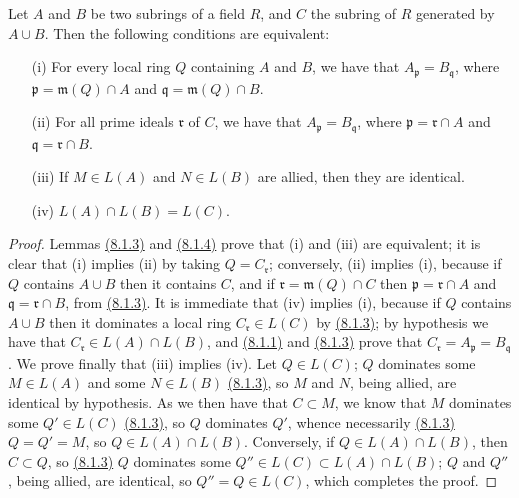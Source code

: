 \begin{prop}[8.1.5]
\label{prop-1.8.1.5}
Let $A$ and $B$ be two subrings of a field $R$,
and $C$ the subring of $R$ generated by $A\cup B$. Then the following
conditions are equivalent:
\begin{itemize}
  \item[{\rm(i)}] For every local ring $Q$ containing $A$ and $B$, we have that
        $A_\mathfrak{p}=B_\mathfrak{q}$, where $\mathfrak{p}=\mathfrak{m}(Q)\cap A$ and
        $\mathfrak{q}=\mathfrak{m}(Q)\cap B$.
  \item[{\rm(ii)}] For all prime ideals $\mathfrak{r}$ of $C$, we have that
        $A_\mathfrak{p}=B_\mathfrak{q}$, where $\mathfrak{p}=\mathfrak{r}\cap A$ and
        $\mathfrak{q}=\mathfrak{r}\cap B$.
  \item[{\rm(iii)}] If $M\in L(A)$ and $N\in L(B)$ are allied, then they are identical.
  \item[{\rm(iv)}] $L(A)\cap L(B)=L(C)$.
\end{itemize}
\end{prop}

\begin{proof}
\label{proof-prop-1.8.1.5}
Lemmas \hyperref[lem-1.8.1.3]{(8.1.3)} and \hyperref[lem-1.8.1.4]{(8.1.4)} prove that (i) and (iii) are equivalent; it
is clear that (i) implies (ii) by taking $Q=C_\mathfrak{r}$; conversely, (ii)
implies (i), because if $Q$ contains $A\cup B$ then it contains $C$, and if
$\mathfrak{r}=\mathfrak{m}(Q)\cap C$ then $\mathfrak{p}=\mathfrak{r}\cap A$ and
$\mathfrak{q}=\mathfrak{r}\cap B$, from \hyperref[lem-1.8.1.3]{(8.1.3)}. It is immediate that (iv)
implies (i), because if $Q$ contains $A\cup B$ then it dominates a local ring
$C_\mathfrak{r}\in L(C)$ by \hyperref[lem-1.8.1.3]{(8.1.3)}; by hypothesis we have that
$C_\mathfrak{r}\in L(A)\cap L(B)$, and \hyperref[lem-1.8.1.1]{(8.1.1)} and \hyperref[lem-1.8.1.3]{(8.1.3)} prove that
$C_\mathfrak{r}=A_\mathfrak{p}=B_\mathfrak{q}$. We prove finally that (iii)
implies (iv). Let $Q\in L(C)$; $Q$ dominates some $M\in L(A)$ and some $N\in
L(B)$ \hyperref[lem-1.8.1.3]{(8.1.3)}, so $M$ and $N$, being allied, are identical by hypothesis.
As we then have that $C\subset M$, we know that $M$ dominates some $Q'\in L(C)$
\hyperref[lem-1.8.1.3]{(8.1.3)}, so $Q$ dominates $Q'$, whence necessarily \hyperref[lem-1.8.1.3]{(8.1.3)} $Q=Q'=M$,
so $Q\in L(A)\cap L(B)$. Conversely, if $Q\in L(A)\cap L(B)$, then $C\subset
Q$, so \hyperref[lem-1.8.1.3]{(8.1.3)} $Q$ dominates some $Q''\in L(C)\subset L(A)\cap L(B)$; $Q$
and $Q''$, being allied, are identical, so $Q''=Q\in L(C)$, which completes the
proof.
\end{proof}

